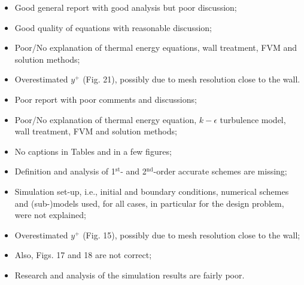 \documentclass[14pt,twoside]{report}
\newcommand\blankpage{%
    \null
    \thispagestyle{empty}%
    \addtocounter{page}{-1}%
    \newpage}
\begin{document}
\clearpage 




\bigskip


\medskip

  \begin{itemize}
%
     \item Good general report with good analysis but poor discussion;
     \item Good quality of equations with reasonable discussion;
     \item Poor/No explanation of thermal energy equations, wall treatment, FVM and solution methods;
     \item Overestimated $y^{+}$ (Fig. 21), possibly due to mesh resolution close to the wall.
%
  \end{itemize}%

\clearpage 




\bigskip


\medskip

  \begin{itemize}
%
     \item Poor report with poor comments and discussions;
     \item Poor/No explanation of thermal energy equation, $k-\epsilon$ turbulence model, wall treatment, FVM and solution methods;
     \item No captions in Tables and in a few figures;
     \item Definition and analysis of 1$^{\text{st}}$- and 2$^{\text{nd}}$-order accurate schemes are missing;
     \item Simulation set-up, i.e., initial and boundary conditions, numerical schemes and (sub-)models used, for all cases, in particular for the design problem, were not explained;
     \item Overestimated $y^{+}$ (Fig. 15), possibly due to mesh resolution close to the wall;
     \item Also, Figs. 17 and 18 are not correct;
     \item Research and analysis of the simulation results are fairly poor.
%
  \end{itemize}%
\end{document}
